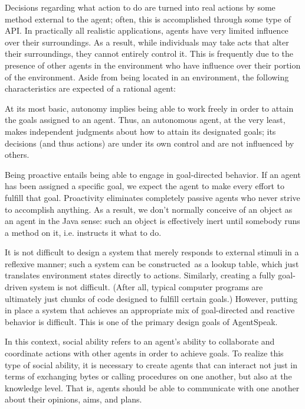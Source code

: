 \vspace{.5cm}

Decisions regarding what action to do are turned into real actions by some method external to the agent; often, this is accomplished through some type of \ac{API}. In practically all realistic applications, agents have very limited influence over their surroundings. As a result, while individuals may take acts that alter their surroundings, they cannot entirely control it. This is frequently due to the presence of other agents in the environment who have influence over their portion of the environment. Aside from being located in an environment, the following characteristics are expected of a rational agent:

\begin{itemize}[label={}]
    At its most basic, autonomy implies being able to work freely in order to attain the goals assigned to an agent. Thus, an autonomous agent, at the very least, makes independent judgments about how to attain its designated goals; its decisions (and thus actions) are under its own control and are not influenced by others.
    
    Being proactive entails being able to engage in goal-directed behavior. If an agent has been assigned a specific goal, we expect the agent to make every effort to fulfill that goal. Proactivity eliminates completely passive agents who never strive to accomplish anything. As a result, we don't normally conceive of an object as an agent in the Java sense: such an object is effectively inert until somebody runs a method on it, i.e. instructs it what to do.
    
    It is not difficult to design a system that merely responds to external stimuli in a reflexive manner; such a system can be constructed as a lookup table, which just translates environment states directly to actions. Similarly, creating a fully goal-driven system is not difficult. (After all, typical computer programs are ultimately just chunks of code designed to fulfill certain goals.) However, putting in place a system that achieves an appropriate mix of goal-directed and reactive behavior is difficult. This is one of the primary design goals of AgentSpeak.
    
    In this context, social ability refers to an agent's ability to collaborate and coordinate actions with other agents in order to achieve goals. To realize this type of social ability, it is necessary to create agents that can interact not just in terms of exchanging bytes or calling procedures on one another, but also at the knowledge level. That is, agents should be able to communicate with one another about their opinions, aims, and plans.
    
\end{itemize}

